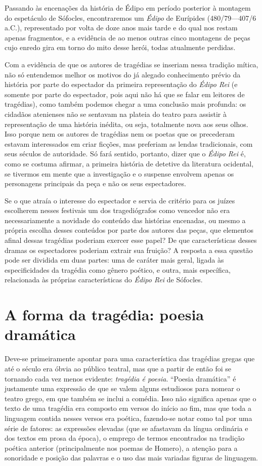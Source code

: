 Passando às encenações da história de Édipo em período posterior à
montagem do espetáculo de Sófocles, encontraremos um \emph{Édipo} de
Eurípides (480/79---407/6 a.C.), representado por volta de doze anos mais
tarde e do qual nos restam apenas fragmentos, e a evidência de ao menos
outras cinco montagens de peças cujo enredo gira em torno do mito desse
herói, todas atualmente perdidas.

Com a evidência de que os autores de tragédias se inseriam nessa
tradição mítica, não só entendemos melhor os motivos do já alegado
conhecimento prévio da história por parte do espectador da primeira
representação do \emph{Édipo Rei} (e somente por parte do espectador,
pois aqui não há que se falar em leitores de tragédias), como também
podemos chegar a uma conclusão mais profunda: os cidadãos atenienses não
se sentavam na plateia do teatro para assistir à representação de uma
história inédita, ou seja, totalmente nova aos seus olhos. Isso porque
nem os autores de tragédias nem os poetas que os precederam estavam
interessados em criar ficções, mas preferiam as lendas tradicionais, com
seus séculos de autoridade. Só fará sentido, portanto, dizer que o
\emph{Édipo Rei} é, como se costuma afirmar, a primeira história de
detetive da literatura ocidental, se tivermos em mente que a
investigação e o suspense envolvem apenas os personagens principais da
peça e não os seus espectadores.

Se o que atraía o interesse do espectador e servia de critério para os
juízes escolherem nesses festivais um dos tragediógrafos como vencedor
não era necessariamente a novidade do conteúdo das histórias encenadas,
ou mesmo a própria escolha desses conteúdos por parte dos autores das
peças, que elementos afinal dessas tragédias poderiam exercer esse
papel? De que características desses dramas os espectadores poderiam
extrair sua fruição? A resposta a essa questão pode ser dividida em duas
partes: uma de caráter mais geral, ligada às especificidades da tragédia
como gênero poético, e outra, mais específica, relacionada às próprias
características do \emph{Édipo Rei} de Sófocles.

\section{A forma da tragédia: poesia dramática}

Deve-se primeiramente apontar para uma característica das tragédias
gregas que até o século  era óbvia ao público teatral, mas que a
partir de então foi se tornando cada vez menos evidente: \emph{tragédia
é poesia}. ``Poesia dramática'' é justamente uma expressão de que se
valem alguns estudiosos para nomear o teatro grego, em que também se
inclui a comédia. Isso não significa apenas que o texto de uma tragédia
era composto em versos do início ao fim, mas que toda a linguagem
contida nesses versos era poética, fazendo-se notar como tal por uma
série de fatores: as expressões elevadas (que se afastavam da língua
ordinária e dos textos em prosa da época), o emprego de termos
encontrados na tradição poética anterior (principalmente nos poemas de
Homero), a atenção para a sonoridade e posição das palavras e o uso das
mais variadas figuras de linguagem.


